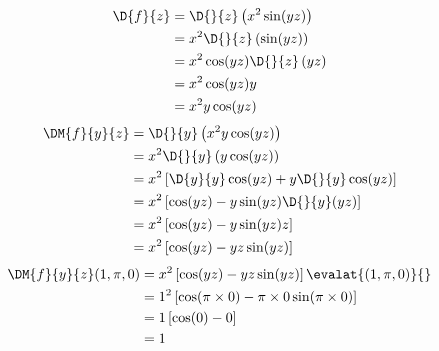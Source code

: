 \documentclass[a4paper,12pt,fleqn]{article}
\begin{document}
\begin{answer}
  \begin{align*}
    \D{f}{z}
    & = \D{}{z}\left(x^2 \sin(yz)\right) \\
    & = x^2 \D{}{z}\left(\sin(yz)\right) \\
    & = x^2 \cos(yz)\D{}{z}\left(yz\right) \\
    & = x^2 \cos(yz) y \\
    & = x^2 y \cos(yz)
  \end{align*}
  \begin{align*}
    \DM{f}{y}{z}
    & = \D{}{y}\left(x^2 y \cos(yz)\right) \\
    & = x^2 \D{}{y}\left(y \cos(yz)\right) \\
    & = x^2 \left[\D{y}{y}\cos(yz) + y\D{}{y}\cos(yz)\right] \\
    & = x^2 \left[\cos(yz) - y\sin(yz)\D{}{y}(yz)\right] \\
    & = x^2 \left[\cos(yz) - y\sin(yz)z\right] \\
    & = x^2 \left[\cos(yz) - yz\sin(yz)\right]
  \end{align*}
  \begin{align*}
    \DM{f}{y}{z}(1, \pi, 0)
    & = x^2 \left[\cos(yz) - yz\sin(yz)\right] \evalat{(1, \pi, 0)}{} \\
    & = 1^2 \left[\cos(\pi\times 0) - \pi\times 0\sin(\pi\times 0)\right] \\
    & = 1 \left[\cos(0) - 0\right] \\
    & = 1
  \end{align*}
\end{answer}

\end{document}
